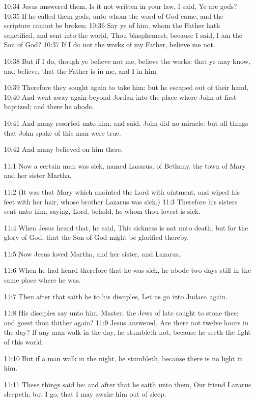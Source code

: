 10:34 Jesus answered them, Is it not written in your law, I said, Ye
are gods?  10:35 If he called them gods, unto whom the word of God
came, and the scripture cannot be broken; 10:36 Say ye of him, whom
the Father hath sanctified, and sent into the world, Thou blasphemest;
because I said, I am the Son of God?  10:37 If I do not the works of
my Father, believe me not.

10:38 But if I do, though ye believe not me, believe the works: that
ye may know, and believe, that the Father is in me, and I in him.

10:39 Therefore they sought again to take him: but he escaped out of
their hand, 10:40 And went away again beyond Jordan into the place
where John at first baptized; and there he abode.

10:41 And many resorted unto him, and said, John did no miracle: but
all things that John spake of this man were true.

10:42 And many believed on him there.

11:1 Now a certain man was sick, named Lazarus, of Bethany, the town
of Mary and her sister Martha.

11:2 (It was that Mary which anointed the Lord with ointment, and
wiped his feet with her hair, whose brother Lazarus was sick.)  11:3
Therefore his sisters sent unto him, saying, Lord, behold, he whom
thou lovest is sick.

11:4 When Jesus heard that, he said, This sickness is not unto death,
but for the glory of God, that the Son of God might be glorified
thereby.

11:5 Now Jesus loved Martha, and her sister, and Lazarus.

11:6 When he had heard therefore that he was sick, he abode two days
still in the same place where he was.

11:7 Then after that saith he to his disciples, Let us go into Judaea
again.

11:8 His disciples say unto him, Master, the Jews of late sought to
stone thee; and goest thou thither again?  11:9 Jesus answered, Are
there not twelve hours in the day? If any man walk in the day, he
stumbleth not, because he seeth the light of this world.

11:10 But if a man walk in the night, he stumbleth, because there is
no light in him.

11:11 These things said he: and after that he saith unto them, Our
friend Lazarus sleepeth; but I go, that I may awake him out of sleep.

